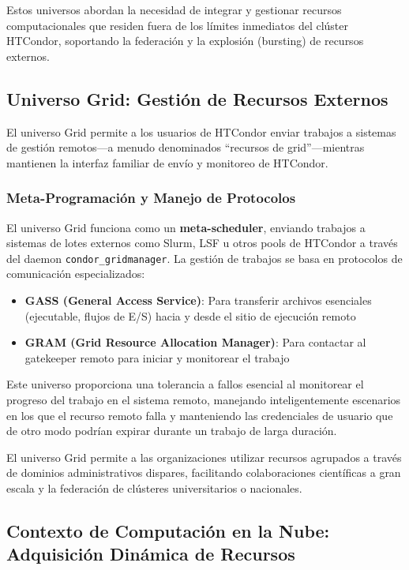 Estos universos abordan la necesidad de integrar y gestionar recursos computacionales que residen fuera de los límites inmediatos del clúster HTCondor, soportando la federación y la explosión (bursting) de recursos externos.

\subsection{Universo Grid: Gestión de Recursos Externos}

El universo Grid permite a los usuarios de HTCondor enviar trabajos a sistemas de gestión remotos---a menudo denominados ``recursos de grid''---mientras mantienen la interfaz familiar de envío y monitoreo de HTCondor.

\subsubsection{Meta-Programación y Manejo de Protocolos}

El universo Grid funciona como un \textbf{meta-scheduler}, enviando trabajos a sistemas de lotes externos como Slurm, LSF u otros pools de HTCondor a través del daemon \texttt{condor\_gridmanager}. La gestión de trabajos se basa en protocolos de comunicación especializados:

\begin{itemize}
	\item \textbf{GASS (General Access Service)}: Para transferir archivos esenciales (ejecutable, flujos de E/S) hacia y desde el sitio de ejecución remoto

	\item \textbf{GRAM (Grid Resource Allocation Manager)}: Para contactar al gatekeeper remoto para iniciar y monitorear el trabajo
\end{itemize}

Este universo proporciona una tolerancia a fallos esencial al monitorear el progreso del trabajo en el sistema remoto, manejando inteligentemente escenarios en los que el recurso remoto falla y manteniendo las credenciales de usuario que de otro modo podrían expirar durante un trabajo de larga duración.

El universo Grid permite a las organizaciones utilizar recursos agrupados a través de dominios administrativos dispares, facilitando colaboraciones científicas a gran escala y la federación de clústeres universitarios o nacionales.

\subsection{Contexto de Computación en la Nube: Adquisición Dinámica de Recursos}

